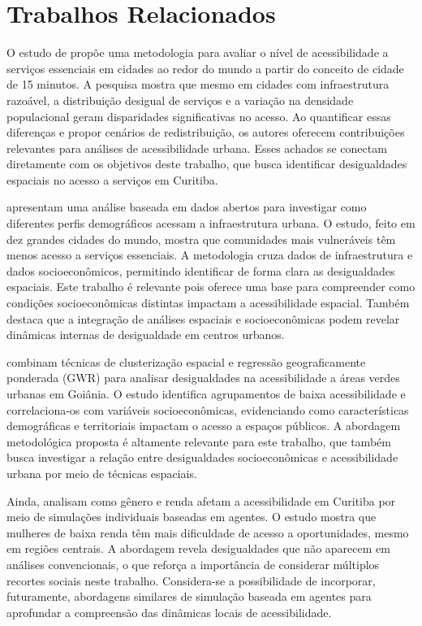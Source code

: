 \section{Trabalhos Relacionados}
\label{sec:related_work}

O estudo de \cite{Bruno2024} propõe uma metodologia para avaliar o nível de acessibilidade a serviços essenciais em cidades ao redor do mundo a partir do conceito de cidade de 15 minutos. A pesquisa mostra que mesmo em cidades com infraestrutura razoável, a distribuição desigual de serviços e a variação na densidade populacional geram disparidades significativas no acesso. Ao quantificar essas diferenças e propor cenários de redistribuição, os autores oferecem contribuições relevantes para análises de acessibilidade urbana. Esses achados se conectam diretamente com os objetivos deste trabalho, que busca identificar desigualdades espaciais no acesso a serviços em Curitiba.

\cite{Nicoletti2022} apresentam uma análise baseada em dados abertos para investigar como diferentes perfis demográficos acessam a infraestrutura urbana. O estudo, feito em dez grandes cidades do mundo, mostra que comunidades mais vulneráveis têm menos acesso a serviços essenciais. A metodologia cruza dados de infraestrutura e dados socioeconômicos, permitindo identificar de forma clara as desigualdades espaciais. Este trabalho é relevante pois oferece uma base para compreender como condições socioeconômicas distintas impactam a acessibilidade espacial. Também destaca que a integração de análises espaciais e socioeconômicas podem revelar dinâmicas internas de desigualdade em centros urbanos.

\cite{Adorno2025} combinam técnicas de clusterização espacial e regressão geograficamente ponderada (GWR) para analisar desigualdades na acessibilidade a áreas verdes urbanas em Goiânia. O estudo identifica agrupamentos de baixa acessibilidade e correlaciona-os com variáveis socioeconômicas, evidenciando como características demográficas e territoriais impactam o acesso a espaços públicos. A abordagem metodológica proposta é altamente relevante para este trabalho, que também busca investigar a relação entre desigualdades socioeconômicas e acessibilidade urbana por meio de técnicas espaciais.

Ainda, \cite{Araujo2025} analisam como gênero e renda afetam a acessibilidade em Curitiba por meio de simulações individuais baseadas em agentes. O estudo mostra que mulheres de baixa renda têm mais dificuldade de acesso a oportunidades, mesmo em regiões centrais. A abordagem revela desigualdades que não aparecem em análises convencionais, o que reforça a importância de considerar múltiplos recortes sociais neste trabalho. Considera-se a possibilidade de incorporar, futuramente, abordagens similares de simulação baseada em agentes para aprofundar a compreensão das dinâmicas locais de acessibilidade.

